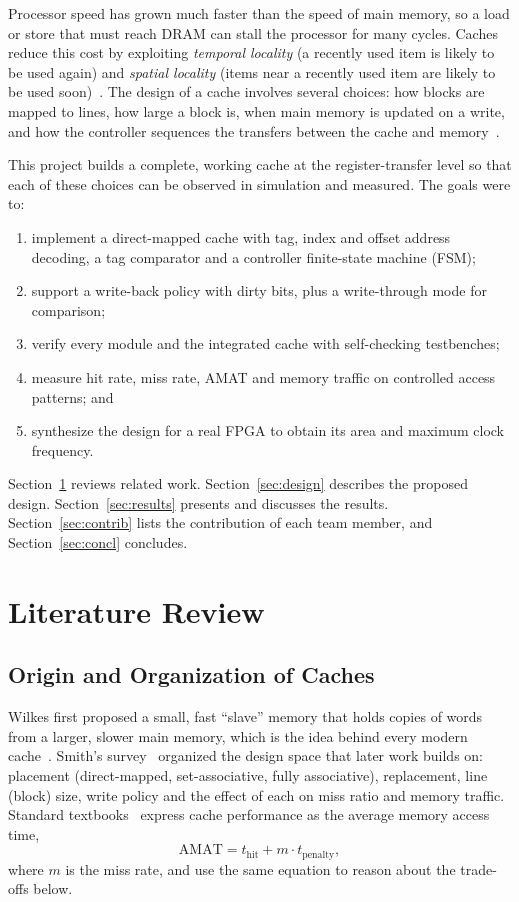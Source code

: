 \documentclass[conference]{IEEEtran}
\begin{document}
Processor speed has grown much faster than the speed of main memory, so a load or store that must reach DRAM can stall the processor for many cycles. Caches reduce this cost by exploiting \emph{temporal locality} (a recently used item is likely to be used again) and \emph{spatial locality} (items near a recently used item are likely to be used soon)~\cite{hennessy2019}. The design of a cache involves several choices: how blocks are mapped to lines, how large a block is, when main memory is updated on a write, and how the controller sequences the transfers between the cache and memory~\cite{smith1982}.

This project builds a complete, working cache at the register-transfer level so that each of these choices can be observed in simulation and measured. The goals were to:
\begin{enumerate}
\item implement a direct-mapped cache with tag, index and offset address decoding, a tag comparator and a controller finite-state machine (FSM);
\item support a write-back policy with dirty bits, plus a write-through mode for comparison;
\item verify every module and the integrated cache with self-checking testbenches;
\item measure hit rate, miss rate, AMAT and memory traffic on controlled access patterns; and
\item synthesize the design for a real FPGA to obtain its area and maximum clock frequency.
\end{enumerate}

Section~\ref{sec:lit} reviews related work. Section~\ref{sec:design} describes the proposed design. Section~\ref{sec:results} presents and discusses the results. Section~\ref{sec:contrib} lists the contribution of each team member, and Section~\ref{sec:concl} concludes.

\section{Literature Review}
\label{sec:lit}

\subsection{Origin and Organization of Caches}
Wilkes first proposed a small, fast ``slave'' memory that holds copies of words from a larger, slower main memory, which is the idea behind every modern cache~\cite{wilkes1965}. Smith's survey~\cite{smith1982} organized the design space that later work builds on: placement (direct-mapped, set-associative, fully associative), replacement, line (block) size, write policy and the effect of each on miss ratio and memory traffic. Standard textbooks~\cite{hennessy2019,patterson2017} express cache performance as the average memory access time,
\begin{equation}
\text{AMAT} = t_{\text{hit}} + m \cdot t_{\text{penalty}},
\label{eq:amat}
\end{equation}
where $m$ is the miss rate, and use the same equation to reason about the trade-offs below.
\end{document}
